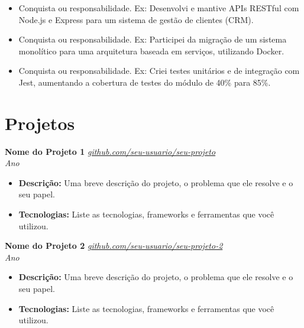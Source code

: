 \documentclass[a4paper,11pt]{article}
\newcommand{\resumeEntry}[4]{
  \vspace{4pt}
  \textbf{#1} \hfill \textit{#2} \\
  \textit{#3} \hfill \textit{#4} \\
}
\begin{document}
\begin{itemize}[leftmargin=*, topsep=2pt, itemsep=2pt]
    \item Conquista ou responsabilidade. Ex: Desenvolvi e mantive APIs RESTful com Node.js e Express para um sistema de gestão de clientes (CRM).
    \item Conquista ou responsabilidade. Ex: Participei da migração de um sistema monolítico para uma arquitetura baseada em serviços, utilizando Docker.
    \item Conquista ou responsabilidade. Ex: Criei testes unitários e de integração com Jest, aumentando a cobertura de testes do módulo de 40\% para 85\%.
\end{itemize}


\section{Projetos}

\resumeEntry
  {Nome do Projeto 1} %
  {\href{https://github.com/seu-usuario/seu-projeto}{github.com/seu-usuario/seu-projeto}} %
  {} %
  {Ano} %

\begin{itemize}[leftmargin=*, topsep=2pt, itemsep=2pt]
    \item \textbf{Descrição:} Uma breve descrição do projeto, o problema que ele resolve e o seu papel.
    \item \textbf{Tecnologias:} Liste as tecnologias, frameworks e ferramentas que você utilizou.
\end{itemize}

\resumeEntry
  {Nome do Projeto 2} %
  {\href{https://github.com/seu-usuario/seu-projeto-2}{github.com/seu-usuario/seu-projeto-2}} %
  {} %
  {Ano} %

\begin{itemize}[leftmargin=*, topsep=2pt, itemsep=2pt]
    \item \textbf{Descrição:} Uma breve descrição do projeto, o problema que ele resolve e o seu papel.
    \item \textbf{Tecnologias:} Liste as tecnologias, frameworks e ferramentas que você utilizou.
\end{itemize}
\end{document}
